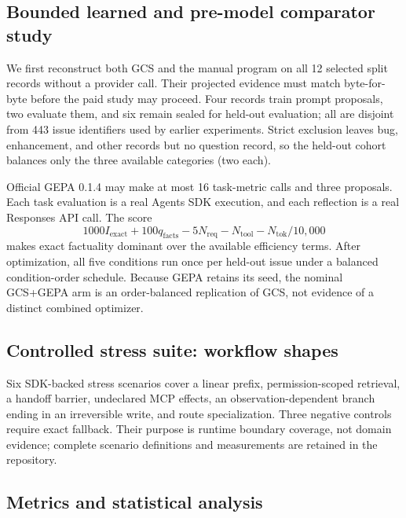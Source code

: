 \subsection{Bounded learned and pre-model comparator study}
\label{sec:optimizer-methodology}

We first reconstruct both GCS and the manual program on all 12 selected split records
without a provider call.  Their projected evidence must match byte-for-byte before the
paid study may proceed.  Four records train prompt proposals, two evaluate them, and six
remain sealed for held-out evaluation; all are disjoint from 443 issue identifiers used by earlier
experiments.  Strict exclusion leaves bug, enhancement, and other records but no question
record, so the held-out cohort balances only the three available categories (two each).

Official GEPA 0.1.4 may make at most 16 task-metric calls and three proposals.  Each task
evaluation is a real Agents SDK execution, and each reflection is a real Responses API
call.  The score
\begin{equation*}
  1000I_{\mathrm{exact}}+100q_{\mathrm{facts}}-5N_{\mathrm{req}}
  -N_{\mathrm{tool}}-N_{\mathrm{tok}}/10{,}000
\end{equation*}
makes exact factuality dominant over the available efficiency terms.  After optimization,
all five conditions run once per held-out issue under a balanced condition-order schedule.
Because GEPA retains its seed, the nominal GCS+GEPA arm is an order-balanced replication
of GCS, not evidence of a distinct combined optimizer.

\subsection{Controlled stress suite: workflow shapes}
\label{sec:demos}

Six SDK-backed stress scenarios cover a linear prefix, permission-scoped retrieval, a
handoff barrier, undeclared MCP effects, an observation-dependent branch ending in an
irreversible write, and route specialization.  Three negative controls require exact
fallback.  Their purpose is runtime boundary coverage, not domain evidence; complete
scenario definitions and measurements are retained in the repository.

\subsection{Metrics and statistical analysis}

